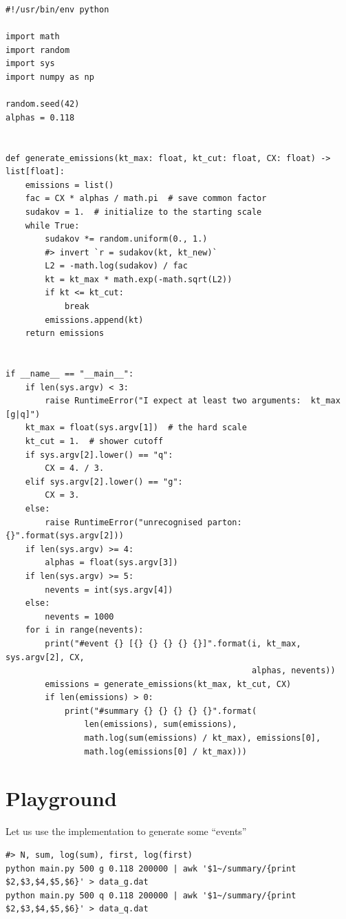 \documentclass[11pt]{article}
\begin{document}
\begin{verbatim}
#!/usr/bin/env python

import math
import random
import sys
import numpy as np

random.seed(42)
alphas = 0.118


def generate_emissions(kt_max: float, kt_cut: float, CX: float) -> list[float]:
    emissions = list()
    fac = CX * alphas / math.pi  # save common factor
    sudakov = 1.  # initialize to the starting scale
    while True:
        sudakov *= random.uniform(0., 1.)
        #> invert `r = sudakov(kt, kt_new)`
        L2 = -math.log(sudakov) / fac
        kt = kt_max * math.exp(-math.sqrt(L2))
        if kt <= kt_cut:
            break
        emissions.append(kt)
    return emissions


if __name__ == "__main__":
    if len(sys.argv) < 3:
        raise RuntimeError("I expect at least two arguments:  kt_max [g|q]")
    kt_max = float(sys.argv[1])  # the hard scale
    kt_cut = 1.  # shower cutoff
    if sys.argv[2].lower() == "q":
        CX = 4. / 3.
    elif sys.argv[2].lower() == "g":
        CX = 3.
    else:
        raise RuntimeError("unrecognised parton: {}".format(sys.argv[2]))
    if len(sys.argv) >= 4:
        alphas = float(sys.argv[3])
    if len(sys.argv) >= 5:
        nevents = int(sys.argv[4])
    else:
        nevents = 1000
    for i in range(nevents):
        print("#event {} [{} {} {} {} {}]".format(i, kt_max, sys.argv[2], CX,
                                                  alphas, nevents))
        emissions = generate_emissions(kt_max, kt_cut, CX)
        if len(emissions) > 0:
            print("#summary {} {} {} {} {}".format(
                len(emissions), sum(emissions),
                math.log(sum(emissions) / kt_max), emissions[0],
                math.log(emissions[0] / kt_max)))
\end{verbatim}
\section{Playground}
\label{sec:org4e1f362}
Let us use the implementation to generate some ``events''
\begin{verbatim}
#> N, sum, log(sum), first, log(first)
python main.py 500 g 0.118 200000 | awk '$1~/summary/{print $2,$3,$4,$5,$6}' > data_g.dat
python main.py 500 q 0.118 200000 | awk '$1~/summary/{print $2,$3,$4,$5,$6}' > data_q.dat
\end{verbatim}
\end{document}
